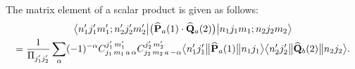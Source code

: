 The matrix element of a scalar product is given as follows:
\begin{multline}
\braOket{ n_{1}^{\prime} j_{1}^{\prime} m_{1}^{\prime} ; n_{2}^{\prime} j_{2}^{\prime} m_{2}^{\prime}}{\bigl(\widehat{\vect{P}}_{a}(1) \cdot \widehat{\vect{Q}}_{a}(2)\bigr)}{n_{1} j_{1} m_{1} ; n_{2} j_{2} m_{2}} \\
=\frac{1}{\Fact{j_{1}^{\prime} j_{2}^{\prime}}} \sum_{\alpha}(-1)^{-\alpha} 
\clebsch{j_{1}}{m_{1}}{a}{\alpha}{j_{1}^{\prime}}{m_{1}^{\prime}} 
\clebsch{j_{2}}{m_{2}}{a}{-\alpha}{j_{2}^{\prime}}{m_{2}^{\prime}}
\braOketred{ n_{1}^{\prime} j_{1}^{\prime}}{\widehat{\vect{P}}_{a}(1)}{ n_{1} j_{1}}
\braOketred{ n_{2}^{\prime} j_{2}^{\prime}}{\widehat{\vect{Q}}_{b}(2)}{ n_{2} j_{2}}. \label{eq:13:1:26}
\end{multline} 


